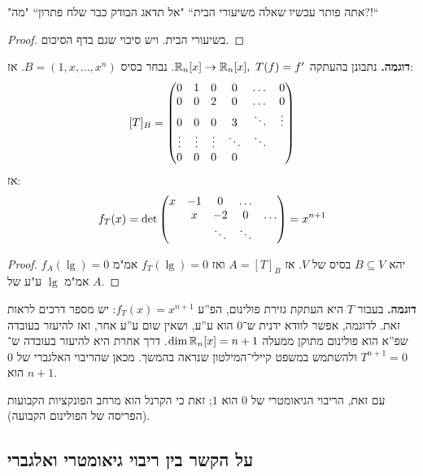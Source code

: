 \documentclass[name=רשימות אלגברה לינארית 2א]{../../../tex/classes/megasumPreamble}
\begin{document}
	"אתה פותר עכשיו שאלה משיעורי הבית`` "אל תדאג הבודק כבר שלח פתרון`` "מה?!``
	
	\begin{proof}
		בשיעורי הבית. ויש סיכוי שגם בדף הסיכום. 
	\end{proof}
	
	\textbf{דוגמה. }נתבונן בהעתקה $\mathbb{R}_n[x] \to \mathbb{R}_n[x], \ T(f) = f'$. נבחר בסיס $B = (1, x, \dots, x^{n})$. אז: 
	\[ [T]_B = \begin{pmatrix} 0 & 1  & 0 & 0 & \dots & 0 \\ 0 & 0 & 2 & 0 & \dots & 0 \\ 0 & 0 & 0 & 3 & \ddots & \vdots \\ \vdots & \vdots & \vdots & \ddots & \ddots \\ 0 & 0 & 0 & 0  \end{pmatrix} \]
	אז: 
	\[ f_T(x) = \det\begin{pmatrix} x & -1 & 0 &\dots \\ & x & -2 & 0 &\dots \\ && \ddots &\ddots  \end{pmatrix} = x^{n + 1} \]
	\begin{proof}
		יהא $B \subseteq V$ בסיס של $V$. אז $A = [T]_B$ ואז $f_T(\lg) = 0$ אמ"מ $f_A(\lg) = 0$ אמ"מ $\lg$ ע"ע של $A$. 
	\end{proof}
	
	
	\textbf{דוגמה. }בעבור $T$ היא העתקת גזירת פולינום, הפ''ע $f_T(x) = x^{n + 1}$: יש מספר דרכים לראות זאת. לדוגמה, אפשר לוודא ידנית ש־$0$ הוא ע''ע, ושאין שום ע''ע אחר, ואז להיעזר בעובדה שפ''א הוא פולינום מתוקן ממעלה $\dim \mathbb{R}_n[x] = n + 1$. דרך אחרת היא להיעזר בעובדה ש־$T^{n + 1} = 0$ ולהשתמש במשפט קיילי־המילטון שנראה בהמשך.  מכאן שהריבוי האלגברי של $0$ הוא $n + 1$. 
	
	 עם זאת, הריבוי הגיאומטרי של $0$ הוא $1$; זאת כי הקרנל הוא מרחב הפונקציות הקבועות (הפריסה של הפולינום הקבועה). 
	
	\subsection{על הקשר בין ריבוי גיאומטרי ואלגברי}\ 
	
\end{document}
